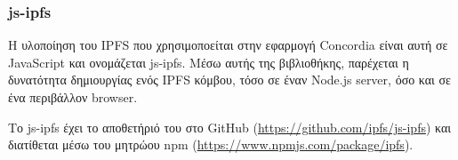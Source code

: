 \subsubsection{js-ipfs} \label{subsection:4-2-4-1-js-ipfs}


H υλοποίηση του IPFS που χρησιμοποείται στην εφαρμογή Concordia είναι αυτή σε JavaScript και ονομάζεται js-ipfs. Μέσω αυτής της βιβλιοθήκης, παρέχεται η δυνατότητα δημιουργίας ενός IPFS κόμβου, τόσο σε έναν Node.js server, όσο και σε ένα περιβάλλον browser.

Το js-ipfs έχει το αποθετήριό του στο GitHub (\url{https://github.com/ipfs/js-ipfs}) και διατίθεται μέσω του μητρώου npm (\url{https://www.npmjs.com/package/ipfs}).
